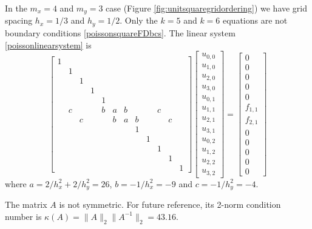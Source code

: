 \medskip\noindent\hrulefill
\begin{example} In the $m_x=4$ and $m_y=3$ case (Figure \ref{fig:unitsquaregridordering}) we have grid spacing $h_x=1/3$ and $h_y=1/2$.  Only the $k=5$ and $k=6$ equations are not boundary conditions \eqref{poissonsquareFDbcs}.  The linear system \eqref{poissonlinearsystem} is
\setcounter{MaxMatrixCols}{20}
\begin{equation*}
\begin{bmatrix}
1 &  &  &  &  &  &  &  &  &  &  &  \\
  & 1&  &  &  &  &  &  &  &  &  &  \\
  &  & 1&  &  &  &  &  &  &  &  &  \\
  &  &  & 1&  &  &  &  &  &  &  &  \\
  &  &  &  & 1&  &  &  &  &  &  &  \\
  & c&  &  & b& a& b&  &  & c&  &  \\
  &  & c&  &  & b& a& b&  &  & c&  \\
  &  &  &  &  &  &  & 1&  &  &  &  \\
  &  &  &  &  &  &  &  & 1&  &  &  \\
  &  &  &  &  &  &  &  &  & 1&  &  \\
  &  &  &  &  &  &  &  &  &  & 1&  \\
  &  &  &  &  &  &  &  &  &  &  & 1
\end{bmatrix}
\begin{bmatrix}
u_{0,0} \\
u_{1,0} \\
u_{2,0} \\
u_{3,0} \\
u_{0,1} \\
u_{1,1} \\
u_{2,1} \\
u_{3,1} \\
u_{0,2} \\
u_{1,2} \\
u_{2,2} \\
u_{3,2}
\end{bmatrix}
=
\begin{bmatrix}
0 \\
0 \\
0 \\
0 \\
0 \\
f_{1,1} \\
f_{2,1} \\
0 \\
0 \\
0 \\
0 \\
0
\end{bmatrix}
\end{equation*}
where $a = 2/h_x^2 + 2/h_y^2 = 26$, $b = - 1/h_x^2 = -9$ and $c = - 1/h_y^2 = -4$.

The matrix $A$ is not symmetric.  For future reference, its 2-norm condition number is $\kappa(A) = \|A\|_2 \|A^{-1}\|_2 = 43.16$.

\noindent\hrulefill
\end{example}

